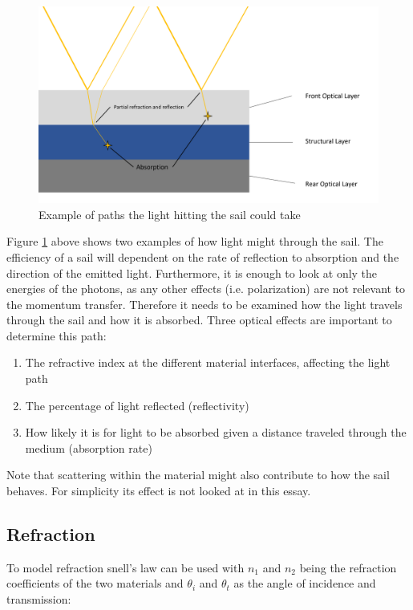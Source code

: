\documentclass[14pt]{article}
\begin{document}
\begin{figure}[H]
  \centering
  \includegraphics[width=14cm]{./resources/complicated_path.png}
  \caption{Example of paths the light hitting the sail could take}
  \label{fig:complicated_path}
\end{figure}

Figure \ref{fig:complicated_path} above shows two examples of how light might through the sail. The efficiency of a sail
will dependent on the rate of reflection to absorption and the direction of the emitted light. Furthermore, it is enough to look
at only the energies of the photons, as any other effects (i.e. polarization) are not relevant to the momentum transfer. Therefore
it needs to be examined how the light travels through the sail and how it is absorbed.
Three optical effects are important to determine this path:
\begin{enumerate}
  \item The refractive index at the different material interfaces, affecting the light path
  \item The percentage of light reflected (reflectivity)
  \item How likely it is for light to be absorbed given a distance traveled through the medium (absorption rate)
\end{enumerate}

Note that scattering within the material might also contribute to how the sail behaves. For simplicity its effect is
not looked at in this essay.

\subsection{Refraction}

To model refraction snell's law can be used with $n_1$ and $n_2$ being the refraction coefficients of the two materials
and $\theta_i$ and $\theta_t$ as the angle of incidence and transmission\autocite{Hecht2016-pd}:
\end{document}
